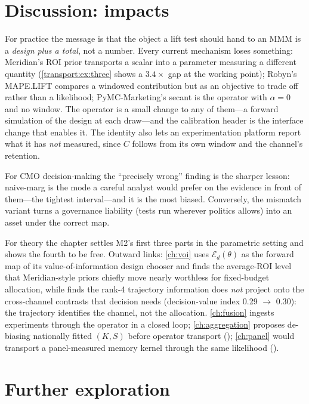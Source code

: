 \section{Discussion: impacts}

For practice the message is that the object a lift test should hand to an MMM is a \emph{design plus a total}, not a number. Every current mechanism loses something: Meridian's ROI prior transports a scalar into a parameter measuring a different quantity (\cref{transport:ex:three} shows a $3.4\times$ gap at the working point); Robyn's MAPE.LIFT compares a windowed contribution but as an objective to trade off rather than a likelihood; PyMC-Marketing's secant is the operator with $\alpha = 0$ and no window. The operator is a small change to any of them---a forward simulation of the design at each draw---and the calibration header is the interface change that enables it. The identity also lets an experimentation platform report what it has \emph{not} measured, since $C$ follows from its own window and the channel's retention.

For CMO decision-making the ``precisely wrong'' finding is the sharper lesson: naive-marg is the mode a careful analyst would prefer on the evidence in front of them---the tightest interval---and it is the most biased. Conversely, the mismatch variant turns a governance liability (tests run wherever politics allows) into an asset under the correct map.

For theory the chapter settles M2's first three parts in the parametric setting and shows the fourth to be free. Outward links: \cref{ch:voi} uses $\mathcal E_d(\theta)$ as the forward map of its value-of-information design chooser and finds the average-ROI level that Meridian-style priors chiefly move nearly worthless for fixed-budget allocation, while  finds the rank-4 trajectory information does \emph{not} project onto the cross-channel contrasts that decision needs (decision-value index 0.29 $\to$ 0.30): the trajectory identifies the channel, not the allocation. \cref{ch:fusion} ingests experiments through the operator in a closed loop; \cref{ch:aggregation} proposes de-biasing nationally fitted $(K, S)$ before operator transport (); \cref{ch:panel} would transport a panel-measured memory kernel through the same likelihood ().

\section{Further exploration}

